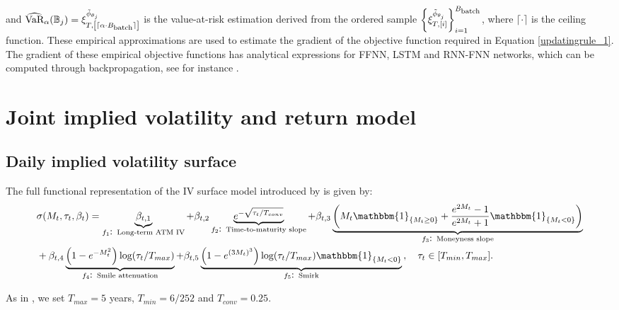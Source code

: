 \documentclass[12pt]{article}
\begin{document}
and $\widehat{\mbox{VaR}}_{\alpha}(\mathbb{B}_{j}) = \xi_{T, \left[\lceil \alpha \cdot B_{\mbox{\scriptsize{batch}}} \rceil \right]}^{\tilde{\phi}_{\theta_{j}}}$ is the value-at-risk estimation derived from the ordered sample $\left\{ \xi_{T,[i]}^{\tilde{\phi}_{\theta_{j}}} \right\}_{i=1}^{B_{\mbox{\scriptsize{batch}}}}$, where $\lceil \cdot \rceil$ is the ceiling function. These empirical approximations are used to estimate the gradient of the objective function required in Equation \eqref{updatingrule_1}. The gradient of these empirical objective functions has analytical expressions for FFNN, LSTM and RNN-FNN networks, which can be computed through backpropagation, see for instance \cite{goodfellow2016deep}.

\section{Joint implied volatility and return model}\label{appen:JIVR}

\subsection{Daily implied volatility surface}\label{subappen:IVsurface}

The full functional representation of the IV surface model introduced by \cite{Frnacois2022} is given by:
\begin{align}
     & \sigma (M_{t},\tau_{t},\beta_{t}) =  \underbrace{\beta_{t,1}}_{f_{1}\mbox{: \scriptsize{Long-term ATM IV}}} +  \beta_{t,2}\underbrace{e^{-\sqrt{\tau_{t} /T_{conv}}}}_{f_{2}\mbox{: \scriptsize{Time-to-maturity slope}}} + \beta_{t,3}\underbrace{\left( M_{t}\mathbbm{1}_{\{ M_{t}\geq 0 \}} + \frac{e^{2M_{t}}-1}{e^{2M_{t}}+1}\mathbbm{1}_{\{M_{t}< 0\}} \right)}_{f_{3}\mbox{: \scriptsize{Moneyness slope}}} \nonumber\\
     & + \beta_{t,4}\underbrace{\left( 1-e^{-M_{t}^{2}} \right)\mbox{log}(\tau_{t}/T_{max})}_{f_{4}\mbox{: \scriptsize{Smile attenuation}}}+\beta_{t,5}\underbrace{\left( 1-e^{(3M_{t})^{3}} \right)\mbox{log}(\tau_{t}/T_{max})\mathbbm{1}_{\{M_{t}< 0\}}}_{f_{5}\mbox{: \scriptsize{Smirk}}}\, , \quad \tau_{t} \in [T_{min},T_{max}]. 
     \label{full_5factormodel}
\end{align}

As in \cite{Frnacois2022}, we set $T_{max}=5$ years, $T_{min}=6/252$ and $T_{conv}=0.25$.%
\end{document}
